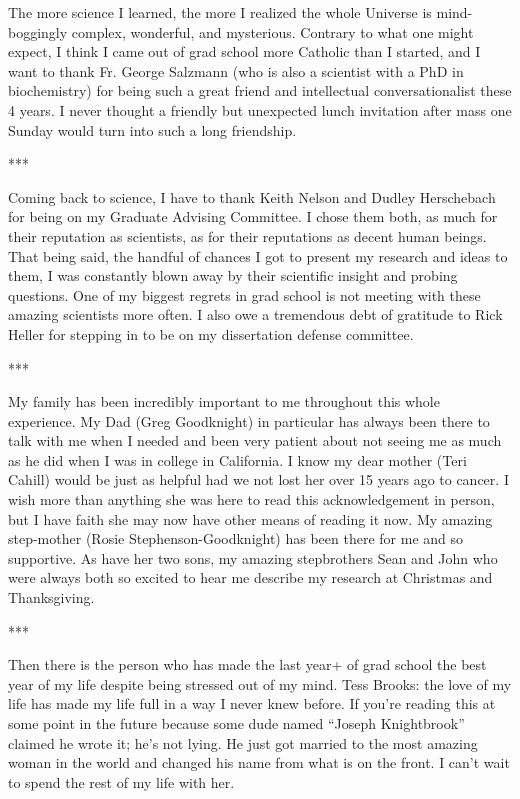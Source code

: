 The more science I learned, the more I realized the whole Universe is mind-boggingly complex, wonderful, and mysterious.  Contrary to what one might expect, I think I came out of grad school more Catholic than I started, and I want to thank Fr. George Salzmann (who is also a scientist with a PhD in biochemistry) for being such a great friend and intellectual conversationalist these 4 years.  I never thought a friendly but unexpected lunch invitation after mass one Sunday would turn into such a long friendship.

\begin{center}
   ***
\end{center}

Coming back to science, I have to thank Keith Nelson and Dudley Herschebach for being on my Graduate Advising Committee.  I chose them both, as much for their reputation as scientists, as for their reputations as decent human beings.  That being said, the handful of chances I got to present my research and ideas to them, I was constantly blown away by their scientific insight and probing questions.  One of my biggest regrets in grad school is not meeting with these amazing scientists more often.  I also owe a tremendous debt of gratitude to Rick Heller for stepping in to be on my dissertation defense committee.

\begin{center}
   ***
\end{center}

My family has been incredibly important to me throughout this whole experience.  My Dad (Greg Goodknight) in particular has always been there to talk with me when I needed and been very patient about not seeing me as much as he did when I was in college in California.  I know my dear mother (Teri Cahill) would be just as helpful had we not lost her over 15 years ago to cancer.  I wish more than anything she was here to read this acknowledgement in person, but I have faith she may now have other means of reading it now.  My amazing step-mother (Rosie Stephenson-Goodknight) has been there for me and so supportive.  As have her two sons, my amazing stepbrothers Sean and John who were always both so excited to hear me describe my research at Christmas and Thanksgiving.

\begin{center}
   ***
\end{center}

Then there is the person who has made the last year+ of grad school the best year of my life despite being stressed out of my mind.  Tess Brooks: the love of my life has made my life full in a way I never knew before.  If you're reading this at some point in the future because some dude named ``Joseph Knightbrook'' claimed he wrote it; he's not lying.  He just got married to the most amazing woman in the world and changed his name from what is on the front.  I can't wait to spend the rest of my life with her.


